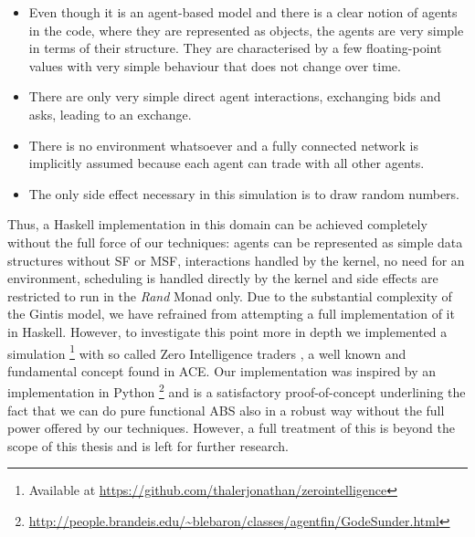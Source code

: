 \begin{itemize}
	\item Even though it is an agent-based model and there is a clear notion of agents in the code, where they are represented as objects, the agents are very simple in terms of their structure. They are characterised by a few floating-point values with very simple behaviour that does not change over time.

	\item There are only very simple direct agent interactions, exchanging bids and asks, leading to an exchange.

	\item There is no environment whatsoever and a fully connected network is implicitly assumed because each agent can trade with all other agents.
	
	\item The only side effect necessary in this simulation is to draw random numbers.
\end{itemize}

Thus, a Haskell implementation in this domain can be achieved completely without the full force of our techniques: agents can be represented as simple data structures without SF or MSF, interactions handled by the kernel, no need for an environment, scheduling is handled directly by the kernel and side effects are restricted to run in the \textit{Rand} Monad only. Due to the substantial complexity of the Gintis model, we have refrained from attempting a full implementation of it in Haskell. However, to investigate this point more in depth we implemented a simulation \footnote{Available at \url{https://github.com/thalerjonathan/zerointelligence}} with so called Zero Intelligence traders \cite{gode_allocative_1993}, a well known and fundamental concept found in ACE. Our implementation was inspired by an implementation in Python \footnote{\url{http://people.brandeis.edu/~blebaron/classes/agentfin/GodeSunder.html}} and is a satisfactory proof-of-concept underlining the fact that we can do pure functional ABS also in a robust way without the full power offered by our techniques. However, a full treatment of this is beyond the scope of this thesis and is left for further research.

